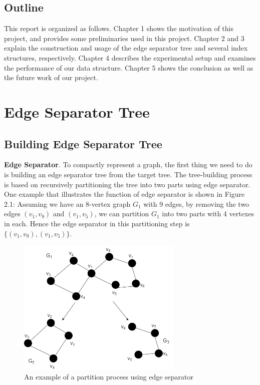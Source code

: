 \documentclass[12pt,glossary]{dalthesis}
\begin{document}
\section{Outline}
This report is organized as follows. Chapter 1 shows the motivation of this project, and provides some preliminaries used in this project. Chapter 2 and 3 explain the construction and usage of the edge separator tree and several index structures, respectively. Chapter 4 describes the experimental setup and examines the performance of our data structure. Chapter 5 shows the conclusion as well as the future work of our project.

\chapter{Edge Separator Tree}


\section{Building Edge Separator Tree}

\textbf{Edge Separator}. To compactly represent a graph, the first thing we need to do is building an edge separator tree from the target tree. The tree-building process is based on recursively partitioning the tree into two parts using edge separator. One example that illustrates the function of edge separator is shown in Figure 2.1: Assuming we have an 8-vertex graph $G_{1}$ with 9 edges, by removing the two edges $(v_{1}, v_{9})$ and $(v_{1}, v_{5})$, we can partition $G_{1}$ into two parts with 4 vertexes in each. Hence the edge separator in this partitioning step is $\{(v_{1}, v_{9}),(v_{1}, v_{5}) \}$.

\bigskip

\begin{figure}[ht]
\centering
\includegraphics[width=0.7\textwidth]{partition}
\caption{An example of a partition process using edge separator}
\end{figure}
\end{document}

